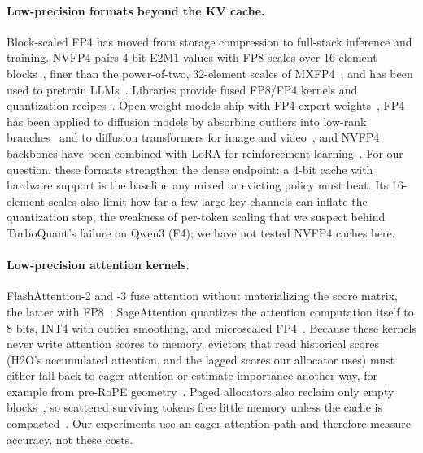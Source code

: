 \paragraph{Low-precision formats beyond the KV cache.}
Block-scaled FP4 has moved from storage compression to full-stack inference and
training.  NVFP4 pairs 4-bit E2M1 values with FP8 scales over 16-element
blocks~\citep{alvarez2025nvfp4,nvidia2025nvfp4ways}, finer than the
power-of-two, 32-element scales of MXFP4~\citep{ocp2023mx}, and has been used
to pretrain LLMs~\citep{nvidia2025nvfp4pretrain,devleker2025nvfp4train}.
Libraries provide fused FP8/FP4 kernels and quantization
recipes~\citep{nvidia2024te,nvidia2024modelopt}.  Open-weight models ship with
FP4 expert weights~\citep{openai2025gptoss,deepseek2026v4}, FP4 has been
applied to diffusion models by absorbing outliers into low-rank
branches~\citep{li2025svdquant} and to diffusion transformers for image and
video~\citep{zhao2024viditq}, and NVFP4 backbones have been combined with LoRA
for reinforcement learning~\citep{huang2025qerl}.  For our question, these
formats strengthen the dense endpoint: a 4-bit cache with hardware support is
the baseline any mixed or evicting policy must beat.  Its 16-element scales
also limit how far a few large key channels can inflate the quantization step,
the weakness of per-token scaling that we suspect behind TurboQuant's failure
on Qwen3 (F4); we have not tested NVFP4 caches here.

\paragraph{Low-precision attention kernels.}
FlashAttention-2 and -3 fuse attention without materializing the score
matrix, the latter with FP8~\citep{dao2023flashattention2,shah2024flashattention3};
SageAttention quantizes the attention computation itself to 8 bits, INT4 with
outlier smoothing, and microscaled FP4~\citep{zhang2024sageattention,zhang2024sageattention2,zhang2025sageattention3}.
Because these kernels never write attention scores to memory, evictors that
read historical scores (H2O's accumulated attention, and the lagged scores our
allocator uses) must either fall back to eager attention or estimate
importance another way, for example from pre-RoPE geometry~\citep{mao2026triattention}.
Paged allocators also reclaim only empty blocks~\citep{kwon2023vllm}, so
scattered surviving tokens free little memory unless the cache is
compacted~\citep{mao2026triattention}.
Our experiments use an eager attention path and therefore measure accuracy,
not these costs.

